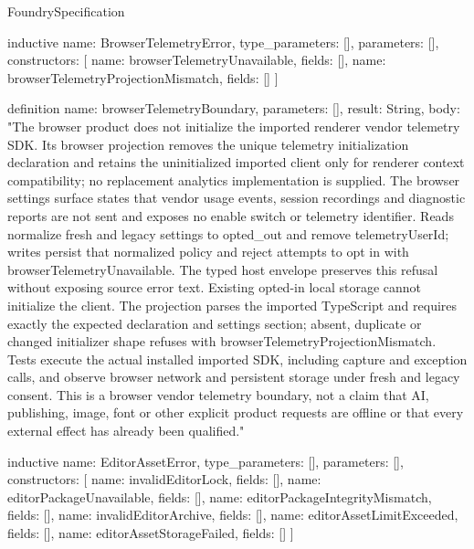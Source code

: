 \begin{lexlean}{FoundrySpecification}
\begin{semanticmodule}
inductive{
  name: BrowserTelemetryError,
  type_parameters: [],
  parameters: [],
  constructors: [
    {name: browserTelemetryUnavailable, fields: []},
    {name: browserTelemetryProjectionMismatch, fields: []}
  ]
}

definition{
  name: browserTelemetryBoundary,
  parameters: [],
  result: String,
  body: "The browser product does not initialize the imported renderer vendor telemetry SDK. Its browser projection removes the unique telemetry initialization declaration and retains the uninitialized imported client only for renderer context compatibility; no replacement analytics implementation is supplied. The browser settings surface states that vendor usage events, session recordings and diagnostic reports are not sent and exposes no enable switch or telemetry identifier. Reads normalize fresh and legacy settings to opted_out and remove telemetryUserId; writes persist that normalized policy and reject attempts to opt in with browserTelemetryUnavailable. The typed host envelope preserves this refusal without exposing source error text. Existing opted-in local storage cannot initialize the client. The projection parses the imported TypeScript and requires exactly the expected declaration and settings section; absent, duplicate or changed initializer shape refuses with browserTelemetryProjectionMismatch. Tests execute the actual installed imported SDK, including capture and exception calls, and observe browser network and persistent storage under fresh and legacy consent. This is a browser vendor telemetry boundary, not a claim that AI, publishing, image, font or other explicit product requests are offline or that every external effect has already been qualified."
}

inductive{
  name: EditorAssetError,
  type_parameters: [],
  parameters: [],
  constructors: [
    {name: invalidEditorLock, fields: []},
    {name: editorPackageUnavailable, fields: []},
    {name: editorPackageIntegrityMismatch, fields: []},
    {name: invalidEditorArchive, fields: []},
    {name: editorAssetLimitExceeded, fields: []},
    {name: editorAssetStorageFailed, fields: []}
  ]
}


\end{semanticmodule}
\end{lexlean}
